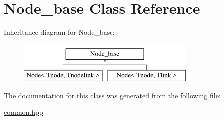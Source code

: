 \hypertarget{classNode__base}{\section{Node\+\_\+base Class Reference}
\label{classNode__base}
}
Inheritance diagram for Node\+\_\+base\+:\begin{figure}[H]
\begin{center}
\leavevmode
\includegraphics[height=2.000000cm]{classNode__base}
\end{center}
\end{figure}


The documentation for this class was generated from the following file\+:\begin{DoxyCompactItemize}
\item 
\hyperlink{common_8hpp}{common.\+hpp}\end{DoxyCompactItemize}
